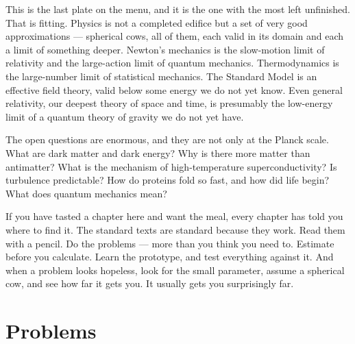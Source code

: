 This is the last plate on the menu, and it is the one with the most left unfinished. That is fitting. Physics is not a completed edifice but a set of very good approximations --- spherical cows, all of them, each valid in its domain and each a limit of something deeper. Newton's mechanics is the slow-motion limit of relativity and the large-action limit of quantum mechanics. Thermodynamics is the large-number limit of statistical mechanics. The Standard Model is an effective field theory, valid below some energy we do not yet know. Even general relativity, our deepest theory of space and time, is presumably the low-energy limit of a quantum theory of gravity we do not yet have.

The open questions are enormous, and they are not only at the Planck scale. What are dark matter and dark energy? Why is there more matter than antimatter? What is the mechanism of high-temperature superconductivity? Is turbulence predictable? How do proteins fold so fast, and how did life begin? What does quantum mechanics mean?

If you have tasted a chapter here and want the meal, every chapter has told you where to find it. The standard texts are standard because they work. Read them with a pencil. Do the problems --- more than you think you need to. Estimate before you calculate. Learn the prototype, and test everything against it. And when a problem looks hopeless, look for the small parameter, assume a spherical cow, and see how far it gets you. It usually gets you surprisingly far.

\section{Problems}

